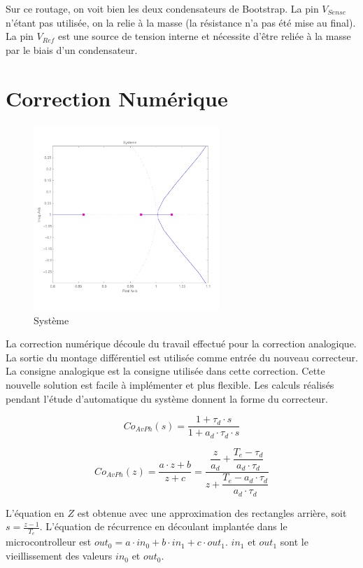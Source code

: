 \documentclass[11pt, french]{article} %
\begin{document}
Sur ce routage, on voit bien les deux condensateurs de Bootstrap. La pin $V_{Sense}$ n'étant pas utilisée, on la relie à la masse (la résistance n'a pas été mise au final). La pin $V_{Ref}$ est une source de tension interne et nécessite d'être reliée à la masse par le biais d'un condensateur. 


\section{Correction Numérique}
\begin{figure}
		
	\includegraphics[width = 7cm,trim=0 1.4cm 0 1.2cm ,clip=true]
					{SolutionNumerique/Systeme.pdf}
	\caption{Système}
\end{figure}
La correction numérique découle du travail effectué pour la correction analogique. La sortie du montage différentiel est utilisée comme entrée du nouveau correcteur. La consigne analogique est la consigne utilisée dans cette correction.
Cette nouvelle solution est facile à implémenter et plus flexible. Les calculs réalisés pendant l'étude d'automatique du système donnent la forme du correcteur.

\[Co_{AvPh}(s)=\dfrac{1+ \tau_d \cdot s}{1 + a_d \cdot \tau_d \cdot s} \]

\[Co_{AvPh}(z)=\dfrac{a \cdot z + b}{z + c}=\dfrac{\dfrac{z}{a_d}+\dfrac{T_e-\tau_d}{a_d \cdot \tau_d} }{z+\dfrac{T_e-a_d \cdot \tau_d}{a_d \cdot \tau_d}}\] 

L'équation en $Z$ est obtenue avec une approximation des rectangles arrière, soit $s=\frac{z-1}{T_e}$. L'équation de récurrence en découlant implantée dans le microcontrolleur est $out_0=a \cdot in_0 + b \cdot in_1 + c \cdot out_1$. 
$in_1$ et $out_1$ sont le vieillissement des valeurs $in_0$ et $out_0$.
\end{document}
